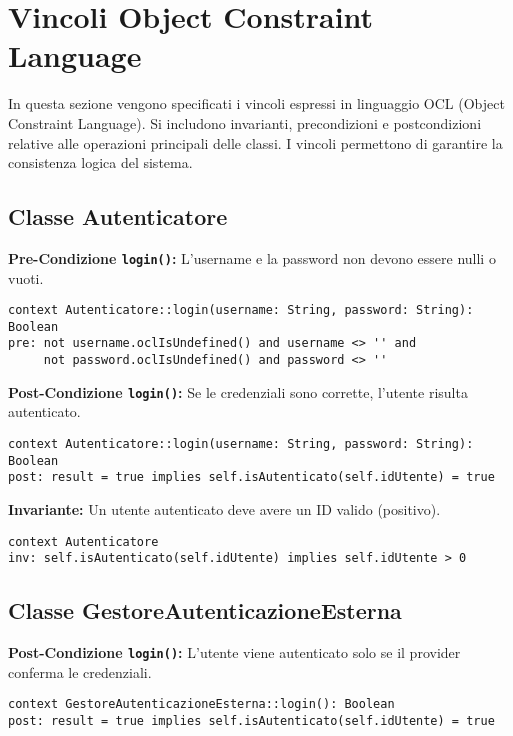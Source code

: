 \section{Vincoli Object Constraint Language}

In questa sezione vengono specificati i vincoli espressi in linguaggio OCL (Object Constraint Language). Si includono invarianti, precondizioni e postcondizioni relative alle operazioni principali delle classi. I vincoli permettono di garantire la consistenza logica del sistema.

\subsection{Classe Autenticatore}

\textbf{Pre-Condizione \texttt{login()}:} L’username e la password non devono essere nulli o vuoti.
\begin{lstlisting}[language=OCL]
context Autenticatore::login(username: String, password: String): Boolean
pre: not username.oclIsUndefined() and username <> '' and
     not password.oclIsUndefined() and password <> ''
\end{lstlisting}

\textbf{Post-Condizione \texttt{login()}:} Se le credenziali sono corrette, l’utente risulta autenticato.
\begin{lstlisting}[language=OCL]
context Autenticatore::login(username: String, password: String): Boolean
post: result = true implies self.isAutenticato(self.idUtente) = true
\end{lstlisting}

\textbf{Invariante:} Un utente autenticato deve avere un ID valido (positivo).
\begin{lstlisting}[language=OCL]
context Autenticatore
inv: self.isAutenticato(self.idUtente) implies self.idUtente > 0
\end{lstlisting}

\subsection{Classe GestoreAutenticazioneEsterna}

\textbf{Post-Condizione \texttt{login()}:} L’utente viene autenticato solo se il provider conferma le credenziali.
\begin{lstlisting}[language=OCL]
context GestoreAutenticazioneEsterna::login(): Boolean
post: result = true implies self.isAutenticato(self.idUtente) = true
\end{lstlisting}


